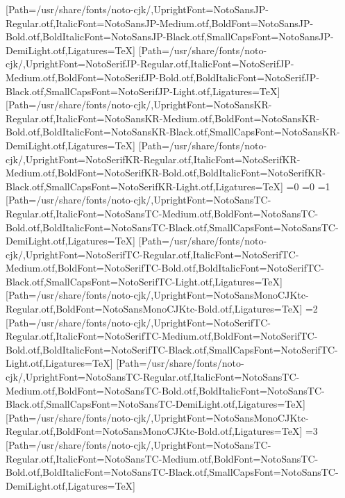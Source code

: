 \newfontfamily{}[Path=/usr/share/fonts/noto-cjk/,UprightFont=NotoSansJP-Regular.otf,ItalicFont=NotoSansJP-Medium.otf,BoldFont=NotoSansJP-Bold.otf,BoldItalicFont=NotoSansJP-Black.otf,SmallCapsFont=NotoSansJP-DemiLight.otf,Ligatures=TeX]
\newfontfamily{}[Path=/usr/share/fonts/noto-cjk/,UprightFont=NotoSerifJP-Regular.otf,ItalicFont=NotoSerifJP-Medium.otf,BoldFont=NotoSerifJP-Bold.otf,BoldItalicFont=NotoSerifJP-Black.otf,SmallCapsFont=NotoSerifJP-Light.otf,Ligatures=TeX]
\newfontfamily{}[Path=/usr/share/fonts/noto-cjk/,UprightFont=NotoSansKR-Regular.otf,ItalicFont=NotoSansKR-Medium.otf,BoldFont=NotoSansKR-Bold.otf,BoldItalicFont=NotoSansKR-Black.otf,SmallCapsFont=NotoSansKR-DemiLight.otf,Ligatures=TeX]
\newfontfamily{}[Path=/usr/share/fonts/noto-cjk/,UprightFont=NotoSerifKR-Regular.otf,ItalicFont=NotoSerifKR-Medium.otf,BoldFont=NotoSerifKR-Bold.otf,BoldItalicFont=NotoSerifKR-Black.otf,SmallCapsFont=NotoSerifKR-Light.otf,Ligatures=TeX]
\fi\fi\fi\fi\fi\fi\fi
\else
\ifnum\value{CJKFonts}=0\else
\ifnum\value{CJKLanguage}=0
\ifnum\value{CJKFonts}=1
[Path=/usr/share/fonts/noto-cjk/,UprightFont=NotoSansTC-Regular.otf,ItalicFont=NotoSansTC-Medium.otf,BoldFont=NotoSansTC-Bold.otf,BoldItalicFont=NotoSansTC-Black.otf,SmallCapsFont=NotoSansTC-DemiLight.otf,Ligatures=TeX]
[Path=/usr/share/fonts/noto-cjk/,UprightFont=NotoSerifTC-Regular.otf,ItalicFont=NotoSerifTC-Medium.otf,BoldFont=NotoSerifTC-Bold.otf,BoldItalicFont=NotoSerifTC-Black.otf,SmallCapsFont=NotoSerifTC-Light.otf,Ligatures=TeX]
[Path=/usr/share/fonts/noto-cjk/,UprightFont=NotoSansMonoCJKtc-Regular.otf,BoldFont=NotoSansMonoCJKtc-Bold.otf,Ligatures=TeX]
\else\ifnum\value{CJKFonts}=2
[Path=/usr/share/fonts/noto-cjk/,UprightFont=NotoSerifTC-Regular.otf,ItalicFont=NotoSerifTC-Medium.otf,BoldFont=NotoSerifTC-Bold.otf,BoldItalicFont=NotoSerifTC-Black.otf,SmallCapsFont=NotoSerifTC-Light.otf,Ligatures=TeX]
[Path=/usr/share/fonts/noto-cjk/,UprightFont=NotoSansTC-Regular.otf,ItalicFont=NotoSansTC-Medium.otf,BoldFont=NotoSansTC-Bold.otf,BoldItalicFont=NotoSansTC-Black.otf,SmallCapsFont=NotoSansTC-DemiLight.otf,Ligatures=TeX]
[Path=/usr/share/fonts/noto-cjk/,UprightFont=NotoSansMonoCJKtc-Regular.otf,BoldFont=NotoSansMonoCJKtc-Bold.otf,Ligatures=TeX]
\else\ifnum\value{CJKFonts}=3
[Path=/usr/share/fonts/noto-cjk/,UprightFont=NotoSansTC-Regular.otf,ItalicFont=NotoSansTC-Medium.otf,BoldFont=NotoSansTC-Bold.otf,BoldItalicFont=NotoSansTC-Black.otf,SmallCapsFont=NotoSansTC-DemiLight.otf,Ligatures=TeX]
